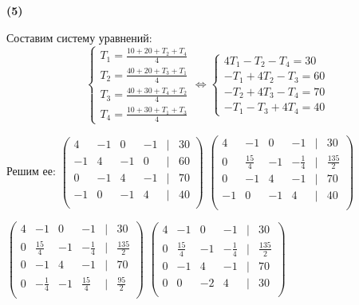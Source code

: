 \documentclass{article}
\begin{document}
\empty


\textsf{\textbf{(5)}}


\hspace{1cm}Составим систему уравнений:
\begin{equation*}
 \begin{cases}
 T_1 = \frac{10 + 20 + T_2 + T_4}{4}
   \\
   
 T_2 = \frac{40 + 20 + T_3 + T_1}{4}
   \\
   
 T_3 = \frac{40 + 30 + T_4 + T_2}{4}
 \\
 T_4 = \frac{10 + 30 + T_1 + T_3}{4}
 \end{cases} \Longleftrightarrow
 \begin{cases}
  4T_1 - T_2 - T_4 = 30
   \\
  - T_1 + 4T_2 - T_3= 60
   \\
  - T_2 +  4T_3 - T_4= 70
 \\
 - T_1 - T_3 + 4T_4= 40
 \end{cases}
\end{equation*}

\hspace{1cm}Решим ее: 
$\begin{pmatrix}
    4 & -1 & 0 & -1 & | & 30 \\
    -1 & 4 & -1 & 0 & | & 60 \\
    0 & -1 & 4 & -1 & | & 70 \\
    -1 & 0 & -1 & 4 & | & 40 \\
\end{pmatrix}$ \Longleftrightarrow
$\begin{pmatrix}
    4 & -1 & 0 & -1 & | & 30 \\
    0 & \frac{15}{4} & -1 & -\frac{1}{4} & | &\frac{135}{2}  \\
    0 & -1 & 4 & -1 & | & 70 \\
    -1 & 0 & -1 & 4 & | & 40 \\
\end{pmatrix}$ \Longleftrightarrow

\hspace{2cm}\Longleftrightarrow
$\begin{pmatrix}
    4 & -1 & 0 & -1 & | & 30 \\
    0 & \frac{15}{4} & -1 & -\frac{1}{4} & | &\frac{135}{2}  \\
    0 & -1 & 4 & -1 & | & 70 \\
    0 & -\frac{1}{4} & -1 & \frac{15}{4} & | & \frac{95}{2} \\
\end{pmatrix}$ \Longleftrightarrow
$\begin{pmatrix}
    4 & -1 & 0 & -1 & | & 30 \\
    0 & \frac{15}{4} & -1 & -\frac{1}{4} & | &\frac{135}{2}  \\
    0 & -1 & 4 & -1 & | & 70 \\
    0 & 0 & -2 & 4 & | & 30 \\
\end{pmatrix}$ \Longleftrightarrow
\end{document}
